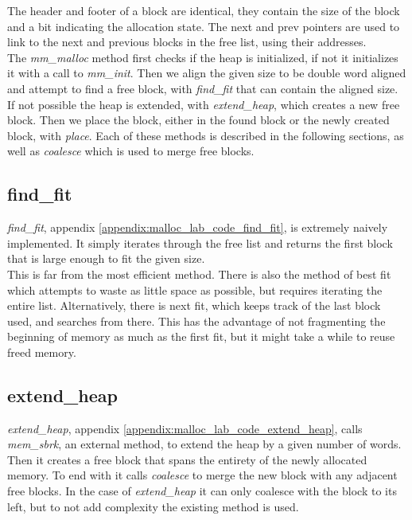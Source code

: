 \documentclass[11pt]{report}
\begin{document}
The header and footer of a block are identical, they contain the size of the block and a bit indicating the allocation state. The next and prev pointers are used to link to the next and previous blocks in the free list, using their addresses.\\[1ex]

The \textit{mm\_malloc} method first checks if the heap is initialized, if not it initializes it with a call to \textit{mm\_init}. Then we align the given size to be double word aligned and attempt to find a free block, with \textit{find\_fit} that can contain the aligned size. If not possible the heap is extended, with \textit{extend\_heap}, which creates a new free block. Then we place the block, either in the found block or the newly created block, with \textit{place}. Each of these methods is described in the following sections, as well as \textit{coalesce} which is used to merge free blocks. 

\subsection{find\_fit}
\textit{find\_fit}, appendix \ref{appendix:malloc_lab_code_find_fit}, is extremely naively implemented. It simply iterates through the free list and returns the first block that is large enough to fit the given size.\\[1ex]

This is far from the most efficient method. There is also the method of best fit which attempts to waste as little space as possible, but requires iterating the entire list. Alternatively, there is next fit, which keeps track of the last block used, and searches from there. This has the advantage of not fragmenting the beginning of memory as much as the first fit, but it might take a while to reuse freed memory.

\subsection{extend\_heap}
\textit{extend\_heap}, appendix \ref{appendix:malloc_lab_code_extend_heap}, calls \textit{mem\_sbrk}, an external method, to extend the heap by a given number of words. Then it creates a free block that spans the entirety of the newly allocated memory. To end with it calls \textit{coalesce} to merge the new block with any adjacent free blocks. In the case of \textit{extend\_heap} it can only coalesce with the block to its left, but to not add complexity the existing method is used.\\[1ex]
\end{document}
